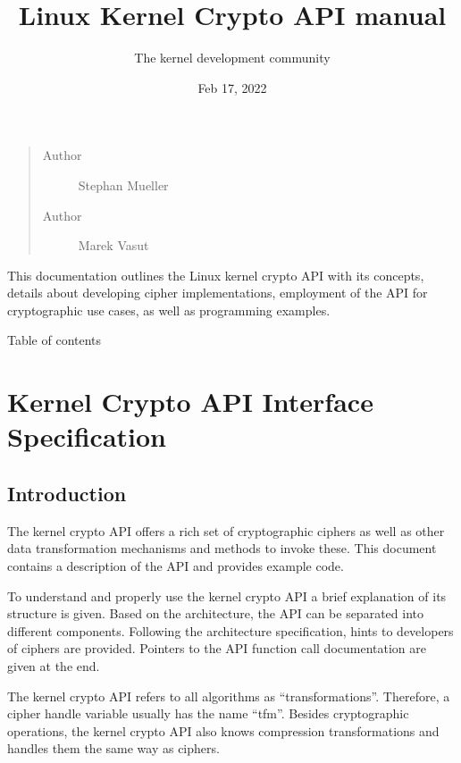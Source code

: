 \documentclass[a4paper,8pt,english]{sphinxmanual}
\title{Linux Kernel Crypto API manual}
\date{Feb 17, 2022}
\author{The kernel development community}
\begin{document}
\maketitle
\tableofcontents
{}\label{crypto/index::doc}

\begin{quote}\begin{description}
\item[{Author}] \leavevmode
Stephan Mueller

\item[{Author}] \leavevmode
Marek Vasut

\end{description}\end{quote}

This documentation outlines the Linux kernel crypto API with its
concepts, details about developing cipher implementations, employment of the API
for cryptographic use cases, as well as programming examples.

Table of contents


\chapter{Kernel Crypto API Interface Specification}
\label{crypto/intro:linux-kernel-crypto-api}\label{crypto/intro::doc}\label{crypto/intro:kernel-crypto-api-interface-specification}

\section{Introduction}
\label{crypto/intro:introduction}
The kernel crypto API offers a rich set of cryptographic ciphers as well
as other data transformation mechanisms and methods to invoke these.
This document contains a description of the API and provides example
code.

To understand and properly use the kernel crypto API a brief explanation
of its structure is given. Based on the architecture, the API can be
separated into different components. Following the architecture
specification, hints to developers of ciphers are provided. Pointers to
the API function call documentation are given at the end.

The kernel crypto API refers to all algorithms as ``transformations''.
Therefore, a cipher handle variable usually has the name ``tfm''. Besides
cryptographic operations, the kernel crypto API also knows compression
transformations and handles them the same way as ciphers.
\end{document}

